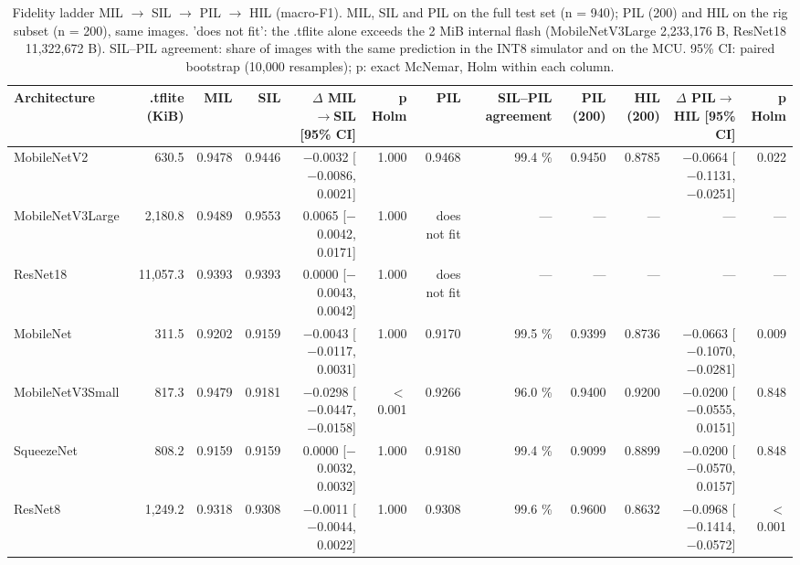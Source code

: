 
\begin{table}[htbp]
\centering
\scriptsize
\caption{Fidelity ladder MIL $\rightarrow$ SIL $\rightarrow$ PIL $\rightarrow$ HIL (macro-F1). MIL, SIL and PIL on the full test set (n = 940); PIL (200) and HIL on the rig subset (n = 200), same images. 'does not fit': the .tflite alone exceeds the 2 MiB internal flash (MobileNetV3Large 2,233,176 B, ResNet18 11,322,672 B). SIL--PIL agreement: share of images with the same prediction in the INT8 simulator and on the MCU. 95\% CI: paired bootstrap (10,000 resamples); p: exact McNemar, Holm within each column.}
\label{tab:ladder1}
\begin{tabular}{lrrrrrrrrrrr}
\toprule
Architecture & .tflite (KiB) & MIL & SIL & $\Delta$ MIL$\rightarrow$SIL [95\% CI] & p Holm & PIL & SIL--PIL agreement & PIL (200) & HIL (200) & $\Delta$ PIL$\rightarrow$HIL [95\% CI] & p Holm \\
\midrule
MobileNetV2 & 630.5 & 0.9478 & 0.9446 & $-$0.0032 [$-$0.0086, 0.0021] & 1.000 & 0.9468 & 99.4 \% & 0.9450 & 0.8785 & $-$0.0664 [$-$0.1131, $-$0.0251] & 0.022 \\
MobileNetV3Large & 2,180.8 & 0.9489 & 0.9553 & 0.0065 [$-$0.0042, 0.0171] & 1.000 & does not fit & --- & --- & --- & --- & --- \\
ResNet18 & 11,057.3 & 0.9393 & 0.9393 & 0.0000 [$-$0.0043, 0.0042] & 1.000 & does not fit & --- & --- & --- & --- & --- \\
MobileNet & 311.5 & 0.9202 & 0.9159 & $-$0.0043 [$-$0.0117, 0.0031] & 1.000 & 0.9170 & 99.5 \% & 0.9399 & 0.8736 & $-$0.0663 [$-$0.1070, $-$0.0281] & 0.009 \\
MobileNetV3Small & 817.3 & 0.9479 & 0.9181 & $-$0.0298 [$-$0.0447, $-$0.0158] & $<$0.001 & 0.9266 & 96.0 \% & 0.9400 & 0.9200 & $-$0.0200 [$-$0.0555, 0.0151] & 0.848 \\
SqueezeNet & 808.2 & 0.9159 & 0.9159 & 0.0000 [$-$0.0032, 0.0032] & 1.000 & 0.9180 & 99.4 \% & 0.9099 & 0.8899 & $-$0.0200 [$-$0.0570, 0.0157] & 0.848 \\
ResNet8 & 1,249.2 & 0.9318 & 0.9308 & $-$0.0011 [$-$0.0044, 0.0022] & 1.000 & 0.9308 & 99.6 \% & 0.9600 & 0.8632 & $-$0.0968 [$-$0.1414, $-$0.0572] & $<$0.001 \\
\bottomrule
\end{tabular}
\end{table}

